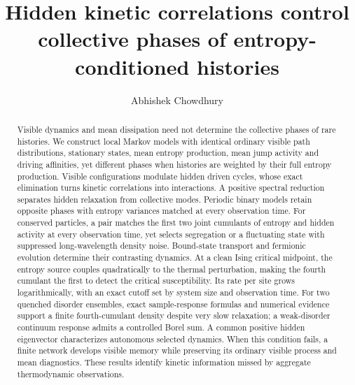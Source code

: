\documentclass[aps,pre,reprint,amsmath,amssymb,longbibliography,floatfix]{revtex4-2}
\begin{document}
\title{Hidden kinetic correlations control collective phases of entropy-conditioned histories}
\author{Abhishek Chowdhury}

\begin{abstract}
Visible dynamics and mean dissipation need not determine the collective
phases of rare histories. We construct local Markov models with identical
ordinary visible path distributions, stationary states, mean entropy
production, mean jump activity and driving affinities, yet different phases
when histories are weighted by their full entropy production. Visible
configurations modulate hidden driven cycles, whose exact elimination turns
kinetic correlations into interactions. A positive spectral reduction
separates hidden relaxation from collective modes. Periodic binary models
retain opposite phases with entropy variances matched at every observation
time. For conserved particles, a pair matches the first two joint cumulants
of entropy and hidden activity at every observation time, yet selects
segregation or a fluctuating state with suppressed long-wavelength density
noise. Bound-state transport and fermionic evolution determine their
contrasting dynamics. At a clean Ising critical midpoint, the entropy source
couples quadratically to the thermal perturbation, making the fourth
cumulant the first to detect the critical susceptibility. Its rate per site
grows logarithmically, with an exact cutoff set by system size and
observation time. For two quenched disorder ensembles, exact sample-response
formulas and numerical evidence support a finite fourth-cumulant density
despite very slow relaxation; a weak-disorder continuum response admits a
controlled Borel sum. A common positive hidden eigenvector characterizes
autonomous selected dynamics. When this condition fails, a finite network
develops visible memory while preserving its ordinary visible process and
mean diagnostics. These results identify kinetic information missed by
aggregate thermodynamic observations.
\end{abstract}
\maketitle
\end{document}
